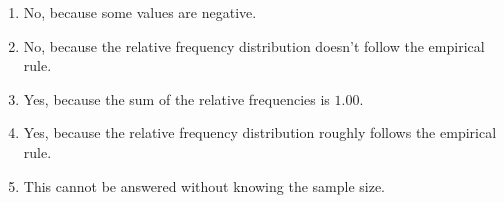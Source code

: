 \documentclass{article}
\begin{document}
\begin{enumerate}
\begin{enumerate}
  \item No, because some values are negative.
  \item No, because the relative frequency distribution doesn’t follow the empirical rule.
  \item Yes, because the sum of the relative frequencies is $1.00$.
  \item Yes, because the relative frequency distribution roughly follows the empirical rule.
  \item This cannot be answered without knowing the sample size.
\end{enumerate}

\end{enumerate}
\end{document}
